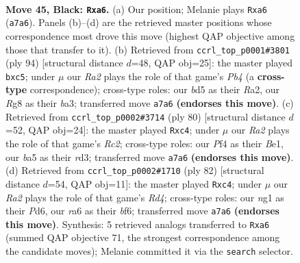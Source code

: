 \documentclass[11pt]{article}
\begin{document}
\clearpage

\begin{figure}[p]\centering
\begin{subfigure}{0.46\textwidth}\centering
\resizebox{\linewidth}{!}{%
\newchessgame
\chessboard[
  setfen={6r1/r3k3/R7/B2B2p1/5pb1/PP6/1K5P/R5N1 b - - 0 45},
  showmover=false,
  pgfstyle=straightmove, color=movearrow, markmove={a7-a6}
]}
\caption{}
\end{subfigure}\hfill
\begin{subfigure}{0.46\textwidth}\centering
\resizebox{\linewidth}{!}{%
\newchessgame
\chessboard[
  setfen={8/8/p3pk1p/1br3pB/1P6/b6P/R4P2/6K1 w - - 0 48},
  showmover=false,
  pgfstyle=straightmove, color=movearrow, markmove={b4-c5}
]}
\caption{}
\end{subfigure}
\\[4pt]
\begin{subfigure}{0.46\textwidth}\centering
\resizebox{\linewidth}{!}{%
\newchessgame
\chessboard[
  setfen={8/5pk1/p5p1/6P1/2r2P2/3rb2P/2R3K1/4B3 w - - 0 41},
  showmover=false,
  pgfstyle=straightmove, color=movearrow, markmove={c2-c4}
]}
\caption{}
\end{subfigure}\hfill
\begin{subfigure}{0.46\textwidth}\centering
\resizebox{\linewidth}{!}{%
\newchessgame
\chessboard[
  setfen={3r2k1/3n2p1/p2P1b1p/8/1PpR4/P7/4R2P/1K6 w - - 2 42},
  showmover=false,
  pgfstyle=straightmove, color=movearrow, markmove={d4-c4}
]}
\caption{}
\end{subfigure}
\caption{\textbf{Move 45, Black: \texttt{Rxa6}.} (a) Our position; Melanie plays \texttt{Rxa6} (\texttt{a7a6}). Panels (b)--(d) are the retrieved master positions whose correspondence most drove this move (highest QAP objective among those that transfer to it). (b) Retrieved from \texttt{ccrl\_top\_p0001\#3801} (ply 94) [structural distance $d$=48, QAP obj=25]: the master played \texttt{bxc5}; under $\mu$ our \emph{Ra2} plays the role of that game's \emph{Pb4} (a \textbf{cross-type} correspondence); cross-type roles: our \emph{b}d5 as their \emph{R}a2, our \emph{R}g8 as their \emph{b}a3; transferred move \texttt{a7a6} \textbf{(endorses this move)}. (c) Retrieved from \texttt{ccrl\_top\_p0002\#3714} (ply 80) [structural distance $d$=52, QAP obj=24]: the master played \texttt{Rxc4}; under $\mu$ our \emph{Ra2} plays the role of that game's \emph{Rc2}; cross-type roles: our \emph{P}f4 as their \emph{B}e1, our \emph{b}a5 as their \emph{r}d3; transferred move \texttt{a7a6} \textbf{(endorses this move)}. (d) Retrieved from \texttt{ccrl\_top\_p0002\#1710} (ply 82) [structural distance $d$=54, QAP obj=11]: the master played \texttt{Rxc4}; under $\mu$ our \emph{Ra2} plays the role of that game's \emph{Rd4}; cross-type roles: our \emph{n}g1 as their \emph{P}d6, our \emph{r}a6 as their \emph{b}f6; transferred move \texttt{a7a6} \textbf{(endorses this move)}. Synthesis: 5 retrieved analogs transferred to \texttt{Rxa6} (summed QAP objective 71, the strongest correspondence among the candidate moves); Melanie committed it via the \texttt{search} selector.}
\label{fig:thought-m89}
\end{figure}
\end{document}
